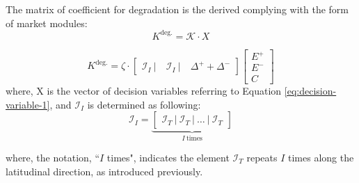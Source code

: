 The matrix of coefficient for degradation is the derived complying with the form of market modules:
\begin{equation}
K^{\text{deg.}}  = \mathcal{K} \cdot X
\end{equation}

\begin{equation}
K^{\text{deg.}} = \zeta \cdot \begin{bmatrix}
\mathcal{I}_I ~|~&\mathcal{I}_I ~|~& \Delta^{+} +\Delta^{-}
\end{bmatrix} \begin{bmatrix}
E^+ \\ E^- \\ C
\end{bmatrix}
\end{equation}
where, X is the vector of decision variables referring to Equation \eqref{eq:decision-variable-1}, and $\mathcal{I}_I$ is determined as following:
\begin{equation}
\label{eq:I_I}
\mathcal{I}_I  = %
\underbrace{\begin{bmatrix}
	\mathcal{I}_T~|~\mathcal{I}_T~|~ \dots~|~\mathcal{I}_T 
	\end{bmatrix}}_{I~\text{times}}
\end{equation}


where, the notation, ``$I$ times", indicates the element $\mathcal{I}_T$ repeats $I$ times along the latitudinal direction, as introduced previously.

